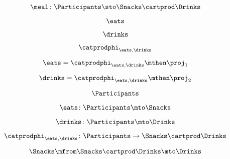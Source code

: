 \begin{forslides}
    \begin{equation}
        \label{eq:feedback-045}
        \meal \colon \Participants\sto \Snacks\cartprod \Drinks
    \end{equation}

    \begin{equation}
        \label{eq:feedback-046}
        \eats
    \end{equation}

    \begin{equation}
        \label{eq:feedback-047}
        \drinks
    \end{equation}

    \begin{equation}
        \label{eq:feedback-048}
        \catprodphi_{\eats,\drinks}
    \end{equation}

    \begin{equation}
        \label{eq:feedback-049}
        \eats =\catprodphi_{\eats,\drinks}\mthen \proj_1
    \end{equation}

    \begin{equation}
        \label{eq:feedback-050}
        \drinks=\catprodphi_{\eats,\drinks}\mthen \proj_2
    \end{equation}

    \begin{equation}
        \label{eq:feedback-051}
        \Participants
    \end{equation}

    \begin{equation}
        \label{eq:feedback-052}
        \eats\colon \Participants \mto \Snacks
    \end{equation}

    \begin{equation}
        \label{eq:feedback-053}
        \drinks\colon \Participants \mto \Drinks
    \end{equation}

    \begin{equation}
        \label{eq:feedback-054}
        \catprodphi_{\eats,\drinks} \colon \Participants \to \Snacks \cartprod \Drinks
    \end{equation}

    \begin{equation}
        \label{eq:feedback-055}
        \Snacks \mfrom \Snacks \cartprod \Drinks \mto \Drinks
    \end{equation}


\end{forslides}
